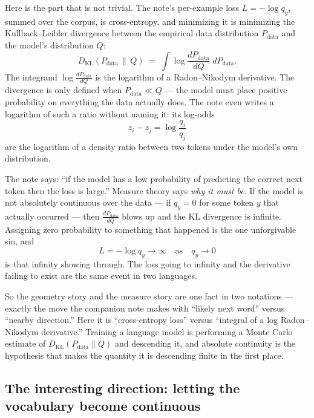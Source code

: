 \documentclass[11pt]{article}
\begin{document}
Here is the part that is not trivial. The note's per-example loss $L = -\log q_y$, summed over
the corpus, is cross-entropy, and minimizing it is minimizing the Kullback--Leibler divergence
between the empirical data distribution $P_{\text{data}}$ and the model's distribution $Q$:
\[
  D_{\mathrm{KL}}(P_{\text{data}} \,\|\, Q)
  \;=\; \int \log\!\frac{dP_{\text{data}}}{dQ} \; dP_{\text{data}} .
\]
The integrand $\log\frac{dP_{\text{data}}}{dQ}$ is the logarithm of a Radon--Nikodym
derivative. The divergence is only defined when $P_{\text{data}} \ll Q$ --- the model must
place positive probability on everything the data actually does. The note even writes a
logarithm of such a ratio without naming it: its log-odds
\[
  z_i - z_j = \log\frac{q_i}{q_j}
\]
are the logarithm of a density ratio between two tokens under the model's own distribution.

\begin{tcolorbox}[colback=yellow!18, colframe=yellow!55!black, arc=2pt, boxrule=0.5pt,
  breakable, left=10pt, right=10pt, top=8pt, bottom=8pt]
The note says: ``if the model has a low probability of predicting the correct next token then
the loss is large.'' Measure theory says \emph{why it must be}. If the model is not absolutely
continuous over the data --- if $q_y = 0$ for some token $y$ that actually occurred --- then
$\frac{dP_{\text{data}}}{dQ}$ blows up and the KL divergence is infinite. Assigning zero
probability to something that happened is the one unforgivable sin, and
\[
  L = -\log q_y \longrightarrow \infty \quad\text{as}\quad q_y \to 0
\]
is that infinity showing through. The loss going to infinity and the derivative failing to
exist are the same event in two languages.
\end{tcolorbox}

\begin{insight}
So the geometry story and the measure story are one fact in two notations --- exactly the move
the companion note makes with ``likely next word'' versus ``nearby direction.'' Here it is
``cross-entropy loss'' versus ``integral of a log Radon--Nikodym derivative.'' Training a
language model is performing a Monte Carlo estimate of $D_{\mathrm{KL}}(P_{\text{data}} \| Q)$
and descending it, and absolute continuity is the hypothesis that makes the quantity it is
descending finite in the first place.
\end{insight}

\subsection*{The interesting direction: letting the vocabulary become continuous}
\end{document}
